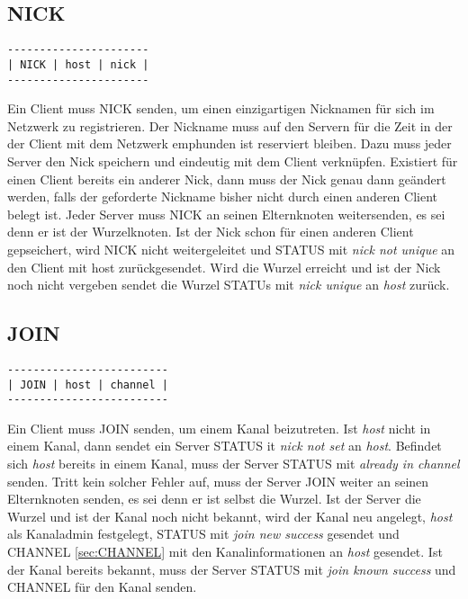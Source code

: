 \documentclass{article}
\begin{document}
\subsection{NICK}

\begin{lstlisting}
----------------------
| NICK | host | nick |
----------------------
\end{lstlisting}

Ein Client muss NICK senden, um einen einzigartigen Nicknamen für sich im Netzwerk zu registrieren.
Der Nickname muss auf den Servern für die Zeit in der der Client mit dem Netzwerk emphunden ist reserviert bleiben.
Dazu muss jeder Server den Nick speichern und eindeutig mit dem Client verknüpfen.
Existiert für einen Client bereits ein anderer Nick, dann muss der Nick genau dann geändert werden, falls der geforderte Nickname bisher nicht durch einen anderen Client belegt ist. 
Jeder Server muss NICK an seinen Elternknoten weitersenden, es sei denn er ist der Wurzelknoten.
Ist der Nick schon für einen anderen Client gepseichert, wird NICK nicht weitergeleitet und STATUS mit \emph{nick not unique} an den Client mit host zurückgesendet. 
Wird die Wurzel erreicht und ist der Nick noch nicht vergeben sendet die Wurzel STATUs mit \emph{nick unique} an \emph{host} zurück.

\subsection{JOIN}

\begin{lstlisting}
-------------------------
| JOIN | host | channel |
-------------------------
\end{lstlisting}

Ein Client muss JOIN senden, um einem Kanal beizutreten.
Ist \emph{host} nicht in einem Kanal, dann sendet ein Server STATUS it \emph{nick not set} an \emph{host}.
Befindet sich \emph{host} bereits in einem Kanal, muss der Server STATUS mit \emph{already in channel} senden.
Tritt kein solcher Fehler auf, muss der Server JOIN weiter an seinen Elternknoten senden, es sei denn er ist selbst die Wurzel.
Ist der Server die Wurzel und ist der Kanal noch nicht bekannt, wird der Kanal neu angelegt, \emph{host} als Kanaladmin festgelegt, STATUS mit \emph{join new success} gesendet und CHANNEL \ref{sec:CHANNEL} mit den Kanalinformationen an \emph{host} gesendet.
Ist der Kanal bereits bekannt, muss der Server STATUS mit \emph{join known success} und CHANNEL für den Kanal senden.
\end{document}
